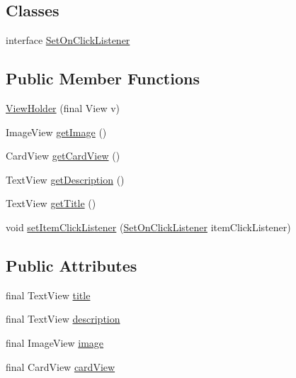 \subsection*{Classes}
\begin{DoxyCompactItemize}
\item 
interface \hyperlink{interfaceorg_1_1buildmlearn_1_1toolkit_1_1adapter_1_1TemplateAdapter_1_1ViewHolder_1_1SetOnClickListener}{Set\+On\+Click\+Listener}
\end{DoxyCompactItemize}
\subsection*{Public Member Functions}
\begin{DoxyCompactItemize}
\item 
\hyperlink{classorg_1_1buildmlearn_1_1toolkit_1_1adapter_1_1TemplateAdapter_1_1ViewHolder_a3c14551693ea450388293f0e6fb2b4c3}{View\+Holder} (final View v)
\item 
Image\+View \hyperlink{classorg_1_1buildmlearn_1_1toolkit_1_1adapter_1_1TemplateAdapter_1_1ViewHolder_a58cf1568dff16fd7562e3a5a7c070429}{get\+Image} ()
\item 
Card\+View \hyperlink{classorg_1_1buildmlearn_1_1toolkit_1_1adapter_1_1TemplateAdapter_1_1ViewHolder_ac05990dade247bc099213f36aaecf824}{get\+Card\+View} ()
\item 
Text\+View \hyperlink{classorg_1_1buildmlearn_1_1toolkit_1_1adapter_1_1TemplateAdapter_1_1ViewHolder_a7a625e9459aab582f65d0cb38ba57304}{get\+Description} ()
\item 
Text\+View \hyperlink{classorg_1_1buildmlearn_1_1toolkit_1_1adapter_1_1TemplateAdapter_1_1ViewHolder_ae9189e0f7ed3196eff409768da596780}{get\+Title} ()
\item 
void \hyperlink{classorg_1_1buildmlearn_1_1toolkit_1_1adapter_1_1TemplateAdapter_1_1ViewHolder_aa33ef07568a705e12c5b73a11c5e8ab8}{set\+Item\+Click\+Listener} (\hyperlink{interfaceorg_1_1buildmlearn_1_1toolkit_1_1adapter_1_1TemplateAdapter_1_1ViewHolder_1_1SetOnClickListener}{Set\+On\+Click\+Listener} item\+Click\+Listener)
\end{DoxyCompactItemize}
\subsection*{Public Attributes}
\begin{DoxyCompactItemize}
\item 
final Text\+View \hyperlink{classorg_1_1buildmlearn_1_1toolkit_1_1adapter_1_1TemplateAdapter_1_1ViewHolder_a1c17241fb519b68d8e1c87286bd12cae}{title}
\item 
final Text\+View \hyperlink{classorg_1_1buildmlearn_1_1toolkit_1_1adapter_1_1TemplateAdapter_1_1ViewHolder_a40a5bb3f2a5bbdc1c3abc8b26534cb3a}{description}
\item 
final Image\+View \hyperlink{classorg_1_1buildmlearn_1_1toolkit_1_1adapter_1_1TemplateAdapter_1_1ViewHolder_a72a77189021e274bf819428879a82685}{image}
\item 
final Card\+View \hyperlink{classorg_1_1buildmlearn_1_1toolkit_1_1adapter_1_1TemplateAdapter_1_1ViewHolder_a121015677fc574882af6e720bbcf4f07}{card\+View}
\end{DoxyCompactItemize}


